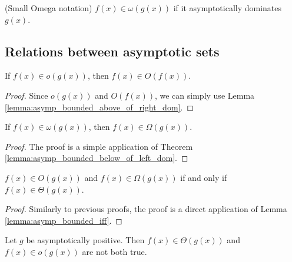 \begin{definition}(Small Omega notation)
    \label{def:small_omega}
    \leanok
    $f(x) \in \omega(g(x))$ if it asymptotically dominates $g(x)$.
\end{definition}


\subsection{Relations between asymptotic sets} 

\begin{lemma}
    \label{lemma:big_o_of_small_o}
    \leanok
    If $f(x) \in o(g(x))$, then $f(x) \in O(f(x))$.
\end{lemma}

\begin{proof}
    \leanok
    Since $o(g(x))$ and $O(f(x))$, we can simply use Lemma 
    \ref{lemma:asymp_bounded_above_of_right_dom}.
\end{proof}

\begin{theorem}
    \label{thm:big_omega_of_small_omega}
    \leanok
    If $f(x) \in \omega(g(x))$, then $f(x) \in \Omega(g(x))$.
\end{theorem}

\begin{proof}
    \leanok
    The proof is a simple application of Theorem 
    \ref{lemma:asymp_bounded_below_of_left_dom}.
\end{proof}

\begin{theorem}
    \label{thm:big_o_and_omega_iff_theta}
    \leanok
    $f(x) \in O(g(x))$ and $f(x) \in \Omega(g(x))$ if and only if $f(x) \in \Theta(g(x))$.
\end{theorem}

\begin{proof}
    \leanok
    Similarly to previous proofs, the proof is a direct application of Lemma 
    \ref{lemma:asymp_bounded_iff}.
\end{proof}

\begin{lemma}
    \label{lemma:not_asymp_pos_theta_and_small_o}
    \leanok
    Let $g$ be asymptotically positive. Then $f(x) \in \Theta(g(x))$ and $f(x) \in o(g(x))$
    are not both true.
\end{lemma}

